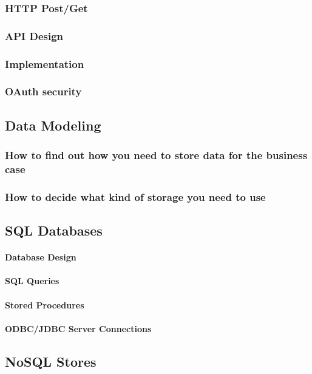 \documentclass[12pt]{scrartcl} %
\begin{document}
\subsubsection{HTTP Post/Get}
\subsubsection{API Design}
\subsubsection{Implementation}
\subsubsection{OAuth security}


\subsection{Data Modeling}

\subsubsection{How to find out how you need to store data for the business case}
\subsubsection{How to decide what kind of storage you need to use}

\subsection{SQL Databases}

\paragraph{Database Design}
\paragraph{SQL Queries}
\paragraph{Stored Procedures}
\paragraph{ODBC/JDBC Server Connections}

\subsection{NoSQL Stores}
\end{document}
